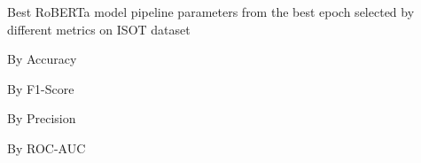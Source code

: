 \begin{table}[!htbp]
    \caption{Best RoBERTa model pipeline parameters from the best epoch selected by different metrics on ISOT dataset}
    \label{tab:isot_roberta_pipeline_params}
    \centering

    \begin{subtable}[t]{0.48\linewidth}
        \scriptsize
        \caption{By Accuracy}
        
    \end{subtable}
    \hfill
    \begin{subtable}[t]{0.48\linewidth}
        \scriptsize
        \caption{By F1-Score}
        
    \end{subtable}

    \vspace{1em}

    \begin{subtable}[t]{0.48\linewidth}
        \scriptsize
        \caption{By Precision}
        
    \end{subtable}
    \hfill
    \begin{subtable}[t]{0.48\linewidth}
        \scriptsize
        \caption{By ROC-AUC}
        
    \end{subtable}

\end{table}